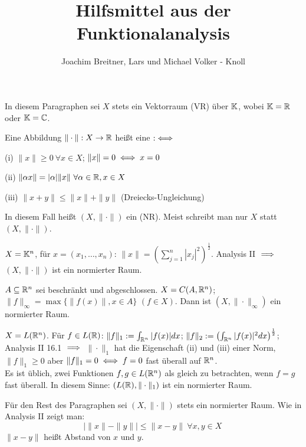 \documentclass{article}
\title{Hilfsmittel aus der Funktionalanalysis}
\author{Joachim Breitner, Lars und Michael Volker - Knoll}
\begin{document}
\maketitle

In diesem Paragraphen sei $X$ stets ein Vektorraum (VR) über $\mathbb{K}$, wobei $\mathbb{K}=\mathbb{R}$ oder $\mathbb{K} = \mathbb{C}$.

\begin{definition}
Eine Abbildung $\|\cdot\|:X\to\mathbb{R}$ heißt eine  $:\iff$
\begin{liste}
\item[(i)] $\|x\| \ge 0\ \forall x\in X$; $\|x\| = 0 \iff x=0$
\item[(ii)] $\|\alpha x \| = |\alpha| \|x\| \ \forall \alpha\in\mathbb{R}, x\in X$
\item[(iii)] $\|x+y\| \le \|x\| + \|y\|$ (Dreiecks-Ungleichung)
\end{liste}
\end{definition}
In diesem Fall heißt $(X,\|\cdot\|)$ ein  (NR). Meist schreibt man nur $X$ statt $(X,\|\cdot\|)$.

\begin{beispiele}
\item $X = \mathbb{K}^n$, für $x=(x_1,\ldots,x_n)$: $\|x\| = \left( \sum_{j=1}^n |x_j|^2 \right)^\frac12$. Analysis II $\implies$ $(X,\|\cdot\|)$ ist ein normierter Raum.
\item $A\subseteq \mathbb{R}^n$ sei beschränkt und abgeschlossen. $X=C(A,\mathbb{R}^n)$; \\
$\|f\|_\infty = \max\{\|f(x)\|, x\in A\}$ $(f\in X)$. Dann ist $(X,\|\cdot\|_\infty)$ ein normierter Raum.
\item $X=L(\mathbb{R}^n)$. Für $f\in L(\mathbb{R})$: $\|f\|_1 := \int_{\mathbb{R}^n} |f(x)|dx$; $\|f\|_2 := \left(\int_{\mathbb{R}^n} |f(x)|^2 dx\right)^\frac12 $;
Analysis II 16.1 $\implies$ $\|\cdot\|_1$ hat die Eigenschaft (ii) und (iii) einer Norm, $\|f\|_1\ge 0$ aber $\|f\|_1=0 \iff f=0$ fast überall auf $\mathbb{R}^n$.\\
Es ist üblich, zwei Funktionen $f,g \in L(\mathbb{R}^n)$ als gleich zu betrachten, wenn $f=g$ fast überall. In diesem Sinne: $(L(\mathbb{R}),\|\cdot\|_1)$ ist ein normierter Raum.
\end{beispiele}

Für den Rest des Paragraphen sei $(X,\|\cdot\|)$ stets ein normierter Raum. Wie in Analysis II zeigt man:
$$ \left| \|x\| - \|y\| \right| \le \|x-y\| \ \forall x,y\in X\, $$
$\|x-y\|$ heißt Abstand von $x$ und $y$.
\end{document}
